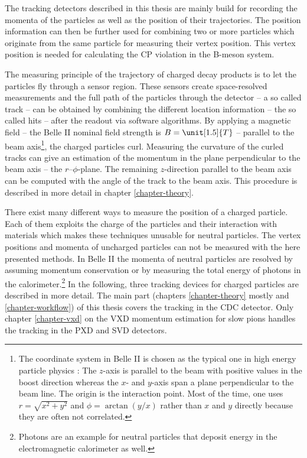 The tracking detectors described in this thesis are mainly build for recording the momenta of the particles as well as the position of their trajectories. The position information can then be further used for combining two or more particles which originate from the same particle for measuring their vertex position. This vertex position is needed for calculating the CP violation in the B-meson system. %

The measuring principle of the trajectory of charged decay products is to let the particles fly through a sensor region. These sensors create space-resolved measurements and the full path of the particles through the detector -- a so called track -- can be obtained by combining the different location information -- the so called hits -- after the readout via software algorithms. By applying a magnetic field -- the Belle II nominal field strength is $B = \unit[1.5]{T}$ -- parallel to the beam axis\footnote{The coordinate system in Belle II is chosen as the typical one in high energy particle physics \cite{coordinate}: The $z$-axis is parallel to the beam with positive values in the boost direction whereas the $x$- and $y$-axis span a plane perpendicular to the beam line. The origin is the interaction point. Most of the time, one uses $r = \sqrt{x^2 + y^2}$ and $\phi = \arctan(y/x)$ rather than $x$ and $y$ directly because they are often not correlated.}, the charged particles curl. Measuring the curvature of the curled tracks can give an estimation of the momentum in the plane perpendicular to the beam axis -- the $r$--$\phi$-plane. The remaining $z$-direction parallel to the beam axis can be computed with the angle of the track to the beam axis. This procedure is described in more detail in chapter \ref{chapter-theory}.

There exist many different ways to measure the position of a charged particle. Each of them exploits the charge of the particles and their interaction with materials which makes these techniques unusable for neutral particles. The vertex positions and momenta of uncharged particles can not be measured with the here presented methods. In Belle II the momenta of neutral particles are resolved by assuming momentum conservation or by measuring the total energy of photons in the calorimeter.\footnote{Photons are an example for neutral particles that deposit energy in the electromagnetic calorimeter as well.} In the following, three tracking devices for charged particles are described in more detail. The main part (chapters \ref{chapter-theory} mostly and \ref{chapter-workflow}) of this thesis covers the tracking in the CDC detector. Only chapter \ref{chapter-vxd} on the VXD momentum estimation for slow pions handles the tracking in the PXD and SVD detectors.


